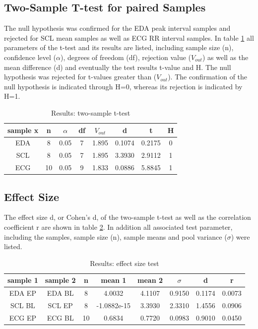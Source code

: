 \subsection{Two-Sample T-test for paired Samples}
The null hypothesis was confirmed for the EDA peak interval samples and rejected for SCL mean samples as well as ECG RR interval samples. In table \ref{ttest} all parameters of the t-test and its results are listed, including sample size (n), confidence level ($\alpha$), degrees of freedom (df), rejection value ($V_{out}$) as well as the mean difference (d) and eventually the test results t-value and H. The null hypothesis was rejected for t-values greater than ($V_{out}$). The confirmation of the null hypothesis is indicated through H=0, whereas its rejection is indicated by H=1.

\begin{table}[h]
\centering
\caption{Results: two-sample t-test}
\begin{tabular}{|c|c|c|c|c|c|c|c|}
\hline
sample x & n & $\alpha$ & df & $V_{out}$ & d & t & H\\
\hline
EDA  & 8 & 0.05 &  7 & 1.895 & 0.1074 & 0.2175 & 0\\
\hline
SCL  & 8 & 0.05 &  7 & 1.895 & 3.3930 & 2.9112 & 1\\
\hline
ECG  & 10 & 0.05 & 9 & 1.833 & 0.0886 & 5.8845 & 1\\
\hline	
\end{tabular}
\label{ttest}
\end{table}

\subsection{Effect Size}
The effect size d, or Cohen's d, of the two-sample t-test as well as the correlation coefficient r are shown in table \ref{effecttest}. In addition all associated test parameter, including the samples, sample size (n), sample means and pool variance ($\sigma$) were listed.

\begin{table}[h]
\centering
\caption{Results: effect size test}
\begin{tabular}{|c|c|c|c|c|c|c|c|}
\hline
sample 1& sample 2 & n & mean 1 & mean 2 & $\sigma$ & d & r\\
\hline
EDA EP & EDA BL & 8 & 4.0032 & 4.1107  & 0.9150  & 0.1174 & 0.0073 \\
\hline
SCL BL & SCL EP & 8 & -1.0882e-15 &  3.3930 & 2.3310 & 1.4556 & 0.0906 \\
\hline
ECG EP & ECG BL & 10 & 0.6834 & 0.7720 & 0.0983 & 0.9010 & 0.0450 \\
\hline	
\end{tabular}
\label{effecttest}
\end{table}

